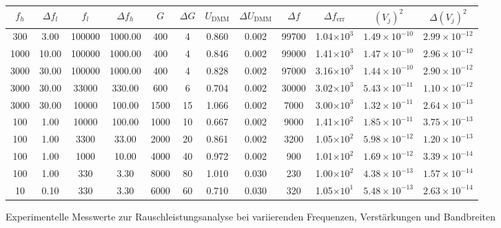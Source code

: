\documentclass{article}
\begin{document}
\begin{minipage}{1.35\textwidth}
\begin{adjustbox}{width=0.9\textwidth}
\begin{tabular}{|c|c|c|c|c|c|c|c|c|c|c|c|}
\hline
$f_h$ & $\Delta f_l$ & $f_l$ & $\Delta f_h$ & $G$ & $\Delta G$ & $U_{\mathrm{DMM}}$ & $\Delta U_{\mathrm{DMM}}$ & $\Delta f$ & $\Delta f_{\text{err}}$ & $(V_j)^2$ & $\Delta (V_j)^2$ \\
\hline
300    & 3.00   & 100000  & 1000.00  & 400   & 4   & 0.860  & 0.002 & 99700  & 1.04$\times10^{3}$ & $1.49\times10^{-10}$ & $2.99\times10^{-12}$ \\
1000   & 10.00  & 100000  & 1000.00  & 400   & 4   & 0.846  & 0.002 & 99000  & 1.41$\times10^{3}$ & $1.47\times10^{-10}$ & $2.96\times10^{-12}$ \\
3000   & 30.00  & 100000  & 1000.00  & 400   & 4   & 0.828  & 0.002 & 97000  & 3.16$\times10^{3}$ & $1.44\times10^{-10}$ & $2.90\times10^{-12}$ \\
3000   & 30.00  & 33000   & 330.00   & 600   & 6   & 0.704  & 0.002 & 30000  & 3.02$\times10^{3}$ & $5.43\times10^{-11}$ & $1.10\times10^{-12}$ \\
3000   & 30.00  & 10000   & 100.00   & 1500  & 15  & 1.066  & 0.002 & 7000   & 3.00$\times10^{3}$ & $1.32\times10^{-11}$ & $2.64\times10^{-13}$ \\
100    & 1.00   & 10000   & 100.00   & 1000  & 10  & 0.667  & 0.002 & 9000   & 1.41$\times10^{2}$ & $1.85\times10^{-11}$ & $3.75\times10^{-13}$ \\
100    & 1.00   & 3300    & 33.00    & 2000  & 20  & 0.861  & 0.002 & 3200   & 1.05$\times10^{2}$ & $5.98\times10^{-12}$ & $1.20\times10^{-13}$ \\
100    & 1.00   & 1000    & 10.00    & 4000  & 40  & 0.972  & 0.002 & 900    & 1.01$\times10^{2}$ & $1.69\times10^{-12}$ & $3.39\times10^{-14}$ \\
100    & 1.00   & 330     & 3.30     & 8000  & 80  & 1.010  & 0.030 & 230    & 1.00$\times10^{2}$ & $4.38\times10^{-13}$ & $1.57\times10^{-14}$ \\
10     & 0.10   & 330     & 3.30     & 6000  & 60  & 0.710  & 0.030 & 320    & 1.05$\times10^{1}$ & $5.48\times10^{-13}$ & $2.63\times10^{-14}$ \\
\hline
\end{tabular}
\end{adjustbox}
\caption{Experimentelle Messwerte zur Rauschleistungsanalyse bei variierenden Frequenzen, Verstärkungen und Bandbreiten}
\label{tab:gerundet}
\end{minipage}\\ \\
\end{document}
